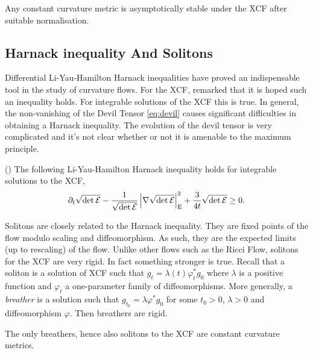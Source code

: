 \documentclass[a4paper,12pt]{amsart}
\begin{document}
\begin{thm}[{\cite[Theorem 4]{MR2448593}}]
\label{thm:hyperbolic_stability}

Any constant curvature metric is asymptotically stable under the XCF after suitable normalisation.
\end{thm}

\subsection{Harnack inequality And Solitons}
\label{subsec:xcf_harnack_solitons}

Differential Li-Yau-Hamilton Harnack inequalities have proved an indispensable tool in the study of curvature flows. For the XCF, \cite[p. 9]{MR2055396} remarked that it is hoped such an inequality holds. For integrable solutions of the XCF this is true. In general, the non-vanishing of the Devil Tensor \eqref{eq:devil} causes significant difficulties in obtaining a Harnack inequality. The evolution of the devil tensor is very complicated and it's not clear whether or not it is amenable to the  maximum principle.

\begin{thm}(\cite[Section 6]{BIS4})
\label{thm:harnack}
The following Li-Yau-Hamilton Harnack inequality holds for integrable solutions to the XCF,
\[
\partial_t \sqrt{\det\operatorname{\mathcal{E}}} - \frac{1}{\sqrt{\det\operatorname{\mathcal{E}}}} \left\lvert{\nabla \sqrt{\det\operatorname{\mathcal{E}}}}\right\rvert_{\operatorname{E}}^2 + \frac{3}{4t}\sqrt{\det\operatorname{\mathcal{E}}} \geq 0.
\]
\end{thm}

Solitons are closely related to the Harnack inequality. They are fixed points of the flow modulo scaling and diffeomorphism. As such, they are the expected limits (up to rescaling) of the flow. Unlike other flows such as the Ricci Flow, solitons for the XCF are very rigid. In fact something stronger is true. Recall that a soliton is a solution of XCF such that \(g_t = \lambda(t) \varphi_t^{\ast} g_0\) where \(\lambda\) is a positive function and \(\varphi_t\) a one-parameter family of diffeomorphisms. More generally, a \emph{breather} is a solution such that \(g_{t_0} = \lambda \varphi^{\ast} g_0\) for some \(t_0 > 0\), \(\lambda > 0\) and diffeomorphism \(\varphi\). Then breathers are rigid.

\begin{thm}[{\cite{MR2302600}}]
The only breathers, hence also solitons to the XCF are constant curvature metrics.
\end{thm}
\end{document}
